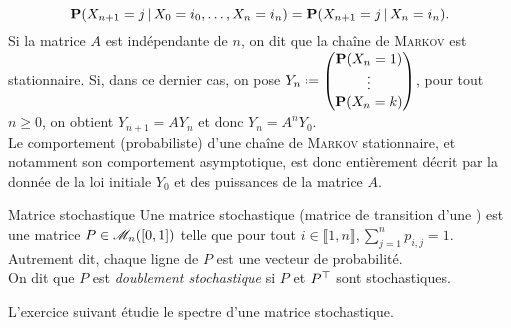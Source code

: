 $$\P(X_{n+1}=j \,|\, X_0=i_0, \dots, X_n = i_n) = \P(X_{n+1} = j \,|\, X_n = i_n).$$
Si la matrice $A$ est indépendante de $n$, on dit que la chaîne de \textsc{Markov} est stationnaire. Si, dans ce dernier cas, on pose $Y_n \defeq \begin{pmatrix} \P(X_n = 1) \\ \vdots \\ \P(X_n = k) \end{pmatrix}$, pour tout $n \geqslant 0$, on obtient $Y_{n+1} = A Y_n$ et donc $Y_n = A^n Y_0$. \\
Le comportement (probabiliste) d'une chaîne de \textsc{Markov} stationnaire, et notamment son comportement asymptotique, est donc entièrement décrit par la donnée de la loi initiale $Y_0$ et des puissances de la matrice $A$. 

\begin{defi}{Matrice stochastique}
    Une matrice stochastique (matrice de transition d'une ) est une matrice $P \in \M_n([0, 1])$ telle que pour tout $i \in \llbracket 1, n \rrbracket, \sum\limits_{j=1}^{n} p_{i,j} = 1$. \\ Autrement dit, chaque ligne de $P$ est une vecteur de probabilité. \\
    On dit que $P$ est \emph{doublement stochastique} si $P$ et $\Trsp{P}$ sont stochastiques.
\end{defi}

L'exercice suivant étudie le spectre d'une matrice stochastique. 


